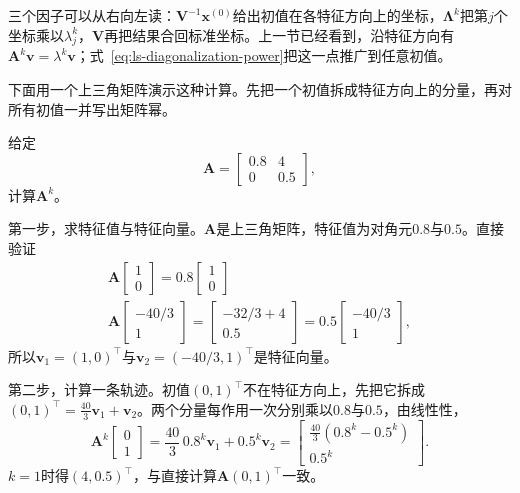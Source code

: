 三个因子可以从右向左读：$\bm V^{-1}\bm x^{(0)}$给出初值在各特征方向上的坐标，$\bm\Lambda^k$把第$j$个坐标乘以$\lambda_j^k$，$\bm V$再把结果合回标准坐标。上一节已经看到，沿特征方向有$\bm A^k\bm v=\lambda^k\bm v$；式~\eqref{eq:ls-diagonalization-power}把这一点推广到任意初值。

下面用一个上三角矩阵演示这种计算。先把一个初值拆成特征方向上的分量，再对所有初值一并写出矩阵幂。
\begin{example}[用特征向量计算矩阵幂]
\label{ex:ls-triangular-power}
给定
\[
 \bm A=\begin{bmatrix}0.8&4\\0&0.5\end{bmatrix},
\]
计算$\bm A^k$。

第一步，求特征值与特征向量。$\bm A$是上三角矩阵，特征值为对角元$0.8$与$0.5$。直接验证
\[
\begin{gathered}
\bm A\begin{bmatrix}1\\0\end{bmatrix}=0.8\begin{bmatrix}1\\0\end{bmatrix}\\
\bm A\begin{bmatrix}-40/3\\1\end{bmatrix}
 =\begin{bmatrix}-32/3+4\\0.5\end{bmatrix}
 =0.5\begin{bmatrix}-40/3\\1\end{bmatrix},
\end{gathered}
\]
所以$\bm v_1=(1,0)^{\top}$与$\bm v_2=(-40/3,1)^{\top}$是特征向量。

第二步，计算一条轨迹。初值$(0,1)^{\top}$不在特征方向上，先把它拆成$(0,1)^{\top}=\tfrac{40}{3}\bm v_1+\bm v_2$。两个分量每作用一次分别乘以$0.8$与$0.5$，由线性性，
\[
 \bm A^k\begin{bmatrix}0\\1\end{bmatrix}
 =\frac{40}{3}\,0.8^k\bm v_1+0.5^k\bm v_2
 =\begin{bmatrix}\tfrac{40}{3}(0.8^k-0.5^k)\\0.5^k\end{bmatrix}.
\]
$k=1$时得$(4,0.5)^{\top}$，与直接计算$\bm A(0,1)^{\top}$一致。


\end{example}
